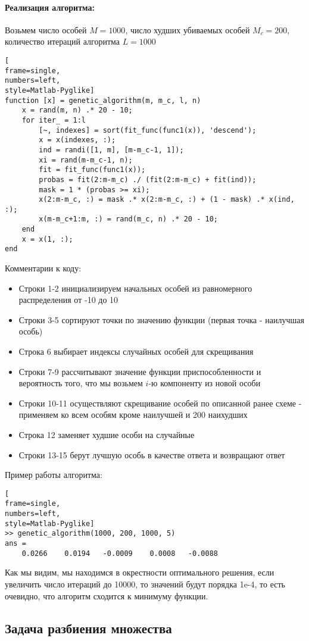 \documentclass[12pt]{article}
\begin{document}
\paragraph{Реализация алгоритма:} Возьмем число особей $M = 1000$, число худших убиваемых особей $M_c = 200$, количество итераций алгоритма $L=1000$
\begin{lstlisting}[
frame=single,
numbers=left,
style=Matlab-Pyglike]
function [x] = genetic_algorithm(m, m_c, l, n)
    x = rand(m, n) .* 20 - 10;
    for iter_ = 1:l
        [~, indexes] = sort(fit_func(func1(x)), 'descend');
        x = x(indexes, :);
        ind = randi([1, m], [m-m_c-1, 1]);
        xi = rand(m-m_c-1, n);
        fit = fit_func(func1(x));
        probas = fit(2:m-m_c) ./ (fit(2:m-m_c) + fit(ind));
        mask = 1 * (probas >= xi);
        x(2:m-m_c, :) = mask .* x(2:m-m_c, :) + (1 - mask) .* x(ind, :);
        x(m-m_c+1:m, :) = rand(m_c, n) .* 20 - 10;
    end
    x = x(1, :);
end
\end{lstlisting}
Комментарии к коду:
\begin{itemize}
	\item Строки 1-2 инициализируем начальных особей из равномерного распределения от -10 до 10
	\item Строки 3-5 сортируют точки по значению функции (первая точка - наилучшая особь)
	\item Строка 6 выбирает индексы случайных особей для скрещивания
	\item Строки 7-9 рассчитывают значение функции приспособленности и вероятность того, что мы возьмем $i$-ю компоненту из новой особи
	\item Строки 10-11 осуществляют скрещивание особей по описанной ранее схеме - применяем ко всем особям кроме наилучшей и 200 наихудших
	\item Строка 12 заменяет худшие особи на случайные
	\item Строки 13-15 берут лучшую особь в качестве ответа и возвращают ответ
\end{itemize}
Пример работы алгоритма:
\begin{lstlisting}[
frame=single,
numbers=left,
style=Matlab-Pyglike]
>> genetic_algorithm(1000, 200, 1000, 5)
ans =
    0.0266    0.0194   -0.0009    0.0008   -0.0088
\end{lstlisting}
Как мы видим, мы находимся в окрестности оптимального решения, если увеличить число итераций до 10000, то значений будут порядка 1e-4, то есть очевидно, что алгоритм сходится к минимуму функции. 
\subsection{Задача разбиения множества}
\end{document}
